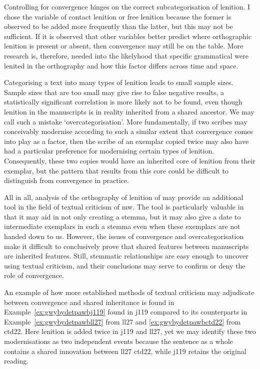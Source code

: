 Controlling for convergence hinges on the correct subcategorisation of lenition. I chose the variable of contact lenition or free lenition because the former is observed to be added more frequently than the latter, but this may not be sufficient. If it is observed that other variables better predict where orthographic lenition is present or absent, then convergence may still be on the table. More research is, therefore, needed into the likelyhood that specific grammatical were lenited in the orthography and how this factor differs across time and space.

Categorising a text into many types of lenition leads to small sample sizes. Sample sizes that are too small may give rise to false negative results, \ie a statistically significant correlation is more likely not to be found, even though lenition in the manuscripts is in reality inherited from a shared ancestor. We may call such a mistake `overcategorisation'. More fundamentally, if two scribes may conceivably modernise according to such a similar extent that convergence comes into play as a factor, then the scribe of an exemplar copied twice may also have had a particular preference for modernising certain types of lenition. Consequently, these two copies would have an inherited core of lenition from their exemplar, but the pattern that results from this core could be difficult to distinguish from convergence in practice.

All in all, analysis of the orthography of lenition of  may provide an additional tool in the field of textual criticism of \gls{mw}. The tool is particularly valuable in that it may aid in not only creating a stemma, but it may also give a date to intermediate exemplars in such a stemma even when these exemplars are not handed down to us. However, the issues of convergence and overcategorisation make it difficult to conclusively prove that shared features between manuscripts are inherited features. Still, stemmatic relationships are easy enough to uncover using textual criticism, and their conclusions may serve to confirm or deny the role of convergence.

An example of how more established methods of textual criticism may adjudicate between convergence and shared inheritance is  found in Example~\ref{ex:gwybydetpawbj119} found in \gls{j119} compared to its counterparts in Example~\ref{ex:gwybydetpawbll27} from \gls{ll27} and \ref{ex:gwybydetpawbctd22} from \gls{ctd22}. Here lenition is added twice in \gls{j119} and \gls{ll27}, yet we may identify these two modernisations as two independent events  because the sentence as a whole contains a shared innovation between \gls{ll27} \gls{ctd22}, while \gls{j119} retains the original reading. 


